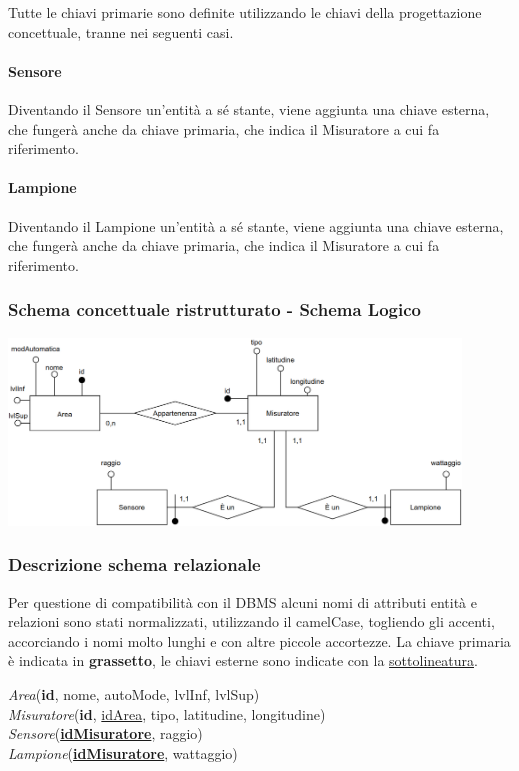 Tutte le chiavi primarie sono definite utilizzando le chiavi della progettazione concettuale, tranne nei seguenti casi.

\paragraph{Sensore} Diventando il Sensore un'entità a sé stante, viene aggiunta una chiave esterna, che fungerà anche da chiave primaria, che indica il Misuratore a cui fa riferimento.

\paragraph{Lampione} Diventando il Lampione un'entità a sé stante, viene aggiunta una chiave esterna, che fungerà anche da chiave primaria, che indica il Misuratore a cui fa riferimento.

\subsubsection{Schema concettuale ristrutturato - Schema Logico}

\begin{center}
    \includegraphics[width=12cm]{contenuti/specifica-basi-dati/img-sbd/anagrafica_logico.png}
\end{center}

\subsubsection{Descrizione schema relazionale}

Per questione di compatibilità con il DBMS alcuni nomi di attributi entità e relazioni sono stati normalizzati, utilizzando il camelCase, togliendo gli accenti, accorciando i nomi molto lunghi e con altre piccole accortezze.
La chiave primaria è indicata in \textbf{grassetto}, le chiavi esterne sono indicate con la \underline{sottolineatura}.

\textit{Area}(\textbf{id}, nome, autoMode, lvlInf, lvlSup) \\
\textit{Misuratore}(\textbf{id}, \underline{idArea}, tipo, latitudine, longitudine) \\
\textit{Sensore}(\underline{\textbf{idMisuratore}}, raggio) \\
\textit{Lampione}(\underline{\textbf{idMisuratore}}, wattaggio)

